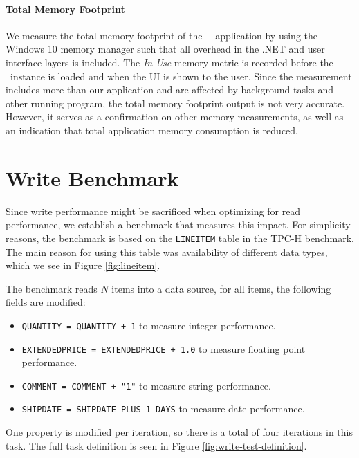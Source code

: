 \paragraph{Total Memory Footprint}
\label{par:Total Memory Footprint}

We measure the total memory footprint of the \tpchdl~\gd~application by using the Windows 10 memory manager such that all overhead in the .NET and user interface layers is included. The \textit{In Use} memory metric is recorded before the \gd~instance is loaded and when the UI is shown to the user. Since the measurement includes more than our application and are affected by background tasks and other running program, the total memory footprint output is not very accurate. However, it serves as a confirmation on other memory measurements, as well as an indication that total application memory consumption is reduced.

\section{Write Benchmark}
\label{bm:write}
Since write performance might be sacrificed when optimizing for read performance, we establish a benchmark that measures this impact. For simplicity reasons, the benchmark is based on the \texttt{LINEITEM} table in the TPC-H benchmark. The main reason for using this table was availability of  different data types, which we see in Figure \ref{fig:lineitem}.

The benchmark reads $N$ items into a data source, for all items, the following fields are modified:
\begin{itemize}
    \item \texttt{QUANTITY = QUANTITY + 1} to measure integer performance.
    \item \texttt{EXTENDEDPRICE = EXTENDEDPRICE + 1.0} to measure floating point performance.
    \item \texttt{COMMENT = COMMENT + "1"} to measure string performance.
    \item \texttt{SHIPDATE = SHIPDATE PLUS 1 DAYS} to measure date performance.
\end{itemize}
One property is modified per iteration, so there is a total of four iterations in this task. The full task definition is seen in Figure \ref{fig:write-test-definition}.

